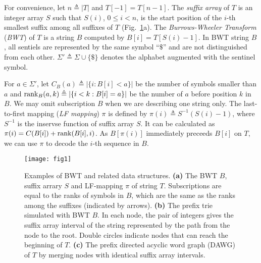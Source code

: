 \documentclass[webpdf,contemporary,large,namedate]{oup-authoring-template}%
\begin{document}
For convenience, let $n\triangleq|T|$ and $T[-1]=T[n-1]$.
The \emph{suffix array} of $T$ is an integer array $S$ such that $S(i)$,
$0\le i<n$, is the start position of the $i$-th smallest suffix among all suffixes of $T$ (Fig.~\ref{fig:1}a).
The \emph{Burrows-Wheeler Transform} (\emph{BWT}) of $T$ is a string $B$ computed by $B[i]=T[S(i)-1]$.
In BWT string $B$, all sentiels are represented by the same symbol ``$\$$'' and are not distinguished from each other.
$\Sigma'\triangleq\Sigma\cup\{\$\}$ denotes the alphabet augmented with the sentinel symbol.

For $a\in\Sigma'$, let $C_B(a)\triangleq|\{i:B[i]<a\}|$ be the number of symbols smaller than $a$
and ${\rm rank}_B(a,k)\triangleq|\{i<k:B[i]=a\}|$ be the number of $a$ before position $k$ in $B$.
We may omit subscription $B$ when we are describing one string only.
The last-to-first mapping (\emph{LF mapping}) $\pi$ is defined by $\pi(i)\triangleq S^{-1}(S(i)-1)$,
where $S^{-1}$ is the inservse function of suffix array $S$.
It can be calculated as $\pi(i)=C(B[i])+{\rm rank}(B[i],i)$.
As $B[\pi(i)]$ immediately preceeds $B[i]$ on $T$, we can use $\pi$ to decode the $i$-th sequence in $B$.

\begin{figure}[bt]
\centering
\texttt{[image: fig1]}
\caption{Examples of BWT and related data structures.
{\bf (a)} The BWT $B$, suffix arrary $S$ and LF-mapping $\pi$ of string $T$.
Subscriptions are equal to the ranks of symbols in $B$, which are the same as the ranks among the suffixes (indicated by arrows).
{\bf (b)} The prefix trie simulated with BWT $B$.
In each node, the pair of integers gives the suffix array interval of the string represented by the path from the node to the root.
Double circles indicate nodes that can reach the beginning of $T$.
{\bf (c)} The prefix directed acyclic word graph (DAWG) of $T$ by merging nodes with identical suffix array intervals.}\label{fig:1}
\end{figure}

\end{document}

